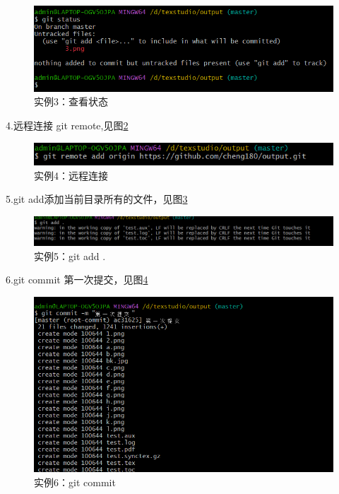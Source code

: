 \documentclass{article}
\begin{document}
		\begin{figure}[h]  
		\centering
		\includegraphics[width=1\textwidth]{3.png}
		\caption{实例3：查看状态}
		\label{fig:example15}
		\end{figure}
	
	\newpage
	
	4.远程连接  git remote,见图\ref{fig:example16}
	
		\begin{figure}[h]  
		\centering
		\includegraphics[width=1\textwidth]{4.png}
		\caption{实例4：远程连接}
		\label{fig:example16}
	\end{figure}
	
	5.git add添加当前目录所有的文件，见图\ref{fig:example17}
	
		\begin{figure}[h]  
		\centering
		\includegraphics[width=1\textwidth]{5.png}
		\caption{实例5：git add .}
		\label{fig:example17}
	\end{figure}
	
	6.git commit 第一次提交，见图\ref{fig:example18}
	
		\begin{figure}[h]  
		\centering
		\includegraphics[width=1\textwidth]{6.png}
		\caption{实例6：git commit}
		\label{fig:example18}
	\end{figure}
	
\end{document}
